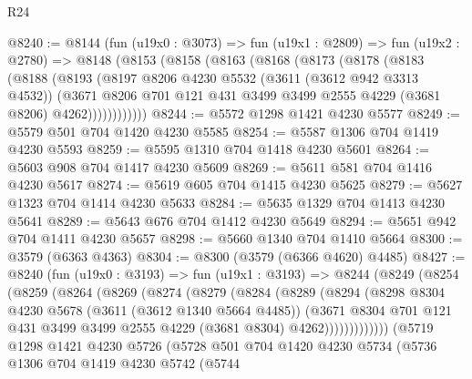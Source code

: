 \begin{lexlean}{R24}
\begin{coremodule}
@8240 := @8144
    (fun (u19x0 : @3073) =>
    fun (u19x1 : @2809) =>
    fun (u19x2 : @2780) =>
    @8148
      (@8153
        (@8158
          (@8163
            (@8168
              (@8173
                (@8178
                  (@8183
                    (@8188
                      (@8193
                        (@8197
                          @8206
                          @4230
                          @5532
                          (@3611 (@3612 @942 @3313 @4532))
                          (@3671
                            @8206
                            @701
                            @121
                            @431
                            @3499
                            @3499
                            @2555
                            @4229
                            (@3681 @8206)
                            @4262))))))))))))
@8244 := @5572 @1298 @1421 @4230 @5577
@8249 := @5579 @501 @704 @1420 @4230 @5585
@8254 := @5587 @1306 @704 @1419 @4230 @5593
@8259 := @5595 @1310 @704 @1418 @4230 @5601
@8264 := @5603 @908 @704 @1417 @4230 @5609
@8269 := @5611 @581 @704 @1416 @4230 @5617
@8274 := @5619 @605 @704 @1415 @4230 @5625
@8279 := @5627 @1323 @704 @1414 @4230 @5633
@8284 := @5635 @1329 @704 @1413 @4230 @5641
@8289 := @5643 @676 @704 @1412 @4230 @5649
@8294 := @5651 @942 @704 @1411 @4230 @5657
@8298 := @5660 @1340 @704 @1410 @5664
@8300 := @3579 (@6363 @4363)
@8304 := @8300 (@3579 (@6366 @4620) @4485)
@8427 := @8240
    (fun (u19x0 : @3193) =>
    fun (u19x1 : @3193) =>
    @8244
      (@8249
        (@8254
          (@8259
            (@8264
              (@8269
                (@8274
                  (@8279
                    (@8284
                      (@8289
                        (@8294
                          (@8298
                            @8304
                            @4230
                            @5678
                            (@3611 (@3612 @1340 @5664 @4485))
                            (@3671
                              @8304
                              @701
                              @121
                              @431
                              @3499
                              @3499
                              @2555
                              @4229
                              (@3681 @8304)
                              @4262)))))))))))))
    (@5719
      @1298
      @1421
      @4230
      @5726
      (@5728
        @501
        @704
        @1420
        @4230
        @5734
        (@5736
          @1306
          @704
          @1419
          @4230
          @5742
          (@5744

\end{coremodule}
\end{lexlean}
